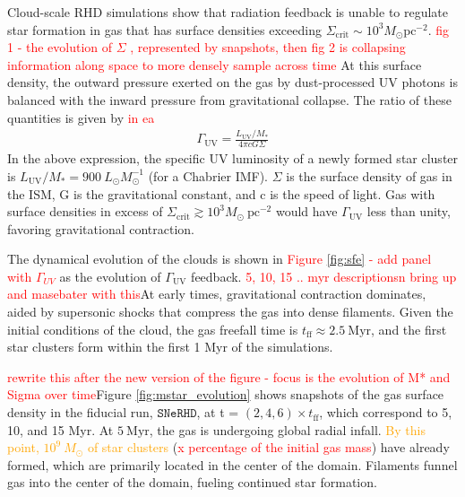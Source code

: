 \documentclass[twocolumn,linenumbers]{aastex631}
\newcommand{\fidsim}{\mathtt{SNeRHD}}
\begin{document}
Cloud-scale RHD simulations \citep{2024ApJ...967L..28M} show that radiation feedback is unable to regulate star formation in gas that has surface densities exceeding $\Sigma_\mathrm{crit} \sim 10^3 M_\odot \mathrm{pc^{-2}}$. 
\textcolor{red}{fig 1 - the evolution of $\Sigma$ , represented by snapshots, then fig 2 is collapsing information along space to more densely sample across time} 
At this surface density, the outward pressure exerted on the gas by dust-processed UV photons is balanced with the inward pressure from gravitational collapse. The ratio of these quantities is given by
\textcolor{red}{in ea}
\begin{align}\label{eq2:Guv}
    \Gamma_\mathrm{UV} = \frac{L_\mathrm{UV}/M_* }{4\pi c G\Sigma}
\end{align}
In the above expression, the specific UV luminosity of a newly formed star cluster is $L_\mathrm{UV}/M_* = 900\ L_\odot M_\odot^{-1}$ (for a Chabrier IMF). $\Sigma$ is the surface density of gas in the ISM, G is the gravitational constant, and c is the speed of light. Gas with surface densities in excess of $\Sigma_\mathrm{crit} \gtrsim 10^3 M_\odot\ \mathrm{pc^{-2}}$ would have $\Gamma_\mathrm{UV}$ less than unity, favoring gravitational contraction. 

The dynamical evolution of the clouds is shown in \textcolor{red}{Figure \ref{fig:sfe} - add panel with $\Gamma_{UV}$} as the evolution of $\Gamma_\mathrm{UV}$ feedback. \textcolor{red}{5, 10, 15 .. myr descriptionsn bring up and masebater with this}At early times, gravitational contraction dominates, aided by supersonic shocks that compress the gas into dense filaments. Given  the initial conditions of the cloud, the gas freefall time is $t_\mathrm{ff} \approx 2.5\ \mathrm{Myr}$, and the first star clusters form within the first 1 Myr of the simulations. 

\textcolor{red}{rewrite this after the new version of the figure - focus is the evolution of  M* and Sigma over time}Figure \ref{fig:mstar_evolution} shows snapshots of the gas surface density in the fiducial run, $\fidsim$, at t = $(2,4,6) \times t_\mathrm{ff}$, which correspond to 5, 10, and 15 Myr. At $5\ \mathrm{Myr}$, the gas is undergoing global radial infall. \textcolor{orange}{By this point, $10^9\ M_\odot$ of star clusters} (\textcolor{red}{x percentage of the initial gas mass}) have already formed, which are primarily located in the center of the domain. Filaments funnel gas into the center of the domain, fueling continued star formation.
\end{document}
